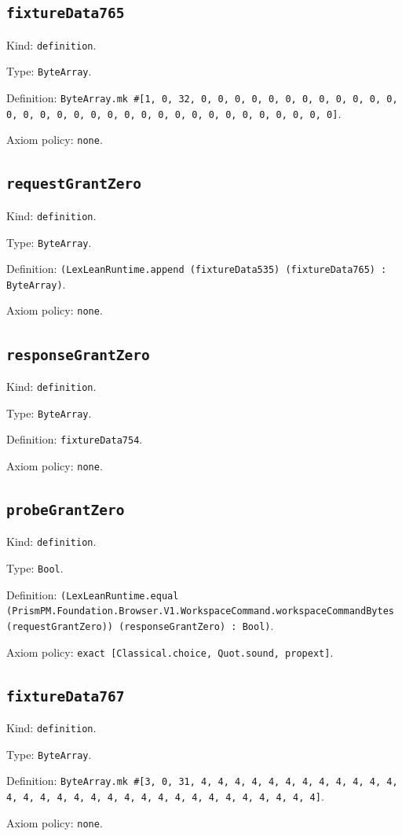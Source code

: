 \documentclass[11pt]{article}
\begin{document}
\subsection*{\texttt{fixtureData765}}
\noindent Kind: \texttt{definition}.\par
\noindent Type: \texttt{ByteArray}.\par
\noindent Definition: \texttt{ByteArray.mk \#[1, 0, 32, 0, 0, 0, 0, 0, 0, 0, 0, 0, 0, 0, 0, 0, 0, 0, 0, 0, 0, 0, 0, 0, 0, 0, 0, 0, 0, 0, 0, 0, 0, 0, 0]}.\par
\noindent Axiom policy: \texttt{none}.\par
\subsection*{\texttt{requestGrantZero}}
\noindent Kind: \texttt{definition}.\par
\noindent Type: \texttt{ByteArray}.\par
\noindent Definition: \texttt{(LexLeanRuntime.append (fixtureData535) (fixtureData765) : ByteArray)}.\par
\noindent Axiom policy: \texttt{none}.\par
\subsection*{\texttt{responseGrantZero}}
\noindent Kind: \texttt{definition}.\par
\noindent Type: \texttt{ByteArray}.\par
\noindent Definition: \texttt{fixtureData754}.\par
\noindent Axiom policy: \texttt{none}.\par
\subsection*{\texttt{probeGrantZero}}
\noindent Kind: \texttt{definition}.\par
\noindent Type: \texttt{Bool}.\par
\noindent Definition: \texttt{(LexLeanRuntime.equal (PrismPM.Foundation.Browser.V1.WorkspaceCommand.workspaceCommandBytes (requestGrantZero)) (responseGrantZero) : Bool)}.\par
\noindent Axiom policy: \texttt{exact [Classical.choice, Quot.sound, propext]}.\par
\subsection*{\texttt{fixtureData767}}
\noindent Kind: \texttt{definition}.\par
\noindent Type: \texttt{ByteArray}.\par
\noindent Definition: \texttt{ByteArray.mk \#[3, 0, 31, 4, 4, 4, 4, 4, 4, 4, 4, 4, 4, 4, 4, 4, 4, 4, 4, 4, 4, 4, 4, 4, 4, 4, 4, 4, 4, 4, 4, 4, 4, 4]}.\par
\noindent Axiom policy: \texttt{none}.\par
\end{document}
